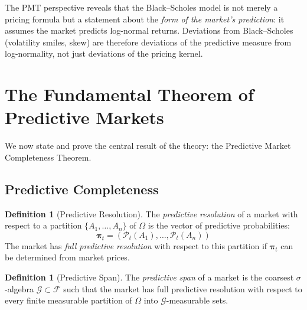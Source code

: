 \documentclass[12pt,a4paper]{article}
\theoremstyle{definition}
\newtheorem{definition}[theorem]{Definition}
\newcommand{\F}{\mathcal{F}}
\newcommand{\G}{\mathcal{G}}
\newcommand{\PP}{\mathcal{P}}
\begin{document}
The PMT perspective reveals that the Black--Scholes model is not merely a pricing formula but a statement about the \emph{form of the market's prediction}: it assumes the market predicts log-normal returns. Deviations from Black--Scholes (volatility smiles, skew) are therefore deviations of the predictive measure from log-normality, not just deviations of the pricing kernel.



\section{The Fundamental Theorem of Predictive Markets}\label{sec:ftpm}

We now state and prove the central result of the theory: the Predictive Market Completeness Theorem.

\subsection{Predictive Completeness}

\begin{definition}[Predictive Resolution]\label{def:pred_resolution}
The \emph{predictive resolution} of a market with respect to a partition $\{A_1, \ldots, A_n\}$ of $\Omega$ is the vector of predictive probabilities:
\begin{equation}
    \boldsymbol{\pi}_t = (\PP_t(A_1), \ldots, \PP_t(A_n))
\end{equation}
The market has \emph{full predictive resolution} with respect to this partition if $\boldsymbol{\pi}_t$ can be determined from market prices.
\end{definition}

\begin{definition}[Predictive Span]\label{def:pred_span}
The \emph{predictive span} of a market is the coarsest $\sigma$-algebra $\G \subset \F$ such that the market has full predictive resolution with respect to every finite measurable partition of $\Omega$ into $\G$-measurable sets.
\end{definition}
\end{document}
